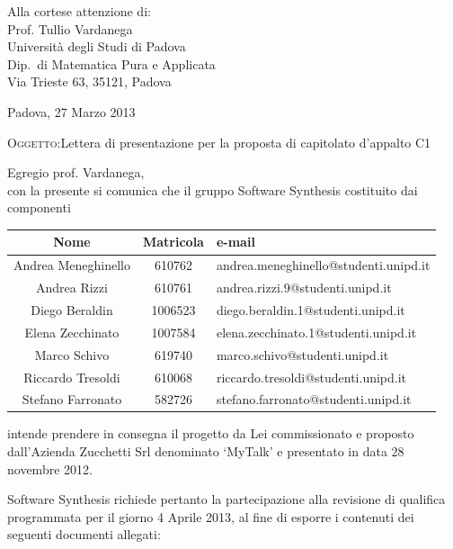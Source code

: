 \documentclass[a4paper,10pt]{letter}
\begin{document}
\begin{flushright}
\begin{minipage}[t]{.5\textwidth}
Alla cortese attenzione di:\\
Prof. Tullio Vardanega\\
Università degli Studi di Padova\\
Dip.~di Matematica Pura e Applicata\\
Via Trieste 63, 35121, Padova\\
\end{minipage}
\end{flushright}

Padova, 27 Marzo 2013

\textsc{Oggetto:}Lettera di presentazione per la proposta di capitolato d’appalto C1

\noindent{}Egregio prof. Vardanega,\\
\hspace*{11em} con la presente si comunica che il gruppo Software Synthesis costituito dai componenti

\begin{center}
\begin{tabular} {c|c|l}
{\bf Nome}&{\bf Matricola}&{\bf e-mail}\\ 
\hline
Andrea Meneghinello & 610762& andrea.meneghinello@studenti.unipd.it\\
Andrea Rizzi & 610761&andrea.rizzi.9@studenti.unipd.it\\
Diego Beraldin& 1006523& diego.beraldin.1@studenti.unipd.it\\
Elena Zecchinato&1007584&elena.zecchinato.1@studenti.unipd.it\\
Marco Schivo &619740& marco.schivo@studenti.unipd.it\\
Riccardo Tresoldi &610068 &riccardo.tresoldi@studenti.unipd.it\\
Stefano Farronato &582726&stefano.farronato@studenti.unipd.it\\
\end{tabular}
\end{center}

intende prendere in consegna il progetto da Lei commissionato e proposto dall'Azienda Zucchetti Srl denominato `MyTalk' e presentato in data 28 novembre 2012.

Software Synthesis richiede pertanto la partecipazione alla revisione di qualifica programmata per il giorno 4 Aprile 2013, al fine di esporre i contenuti dei seguenti documenti allegati:
\end{document}
